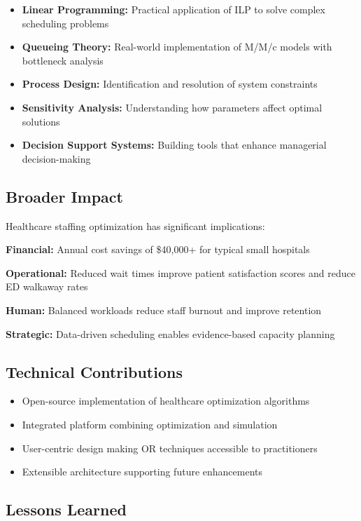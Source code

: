 \documentclass[12pt,a4paper]{article}
\begin{document}
\begin{itemize}
    \item \textbf{Linear Programming:} Practical application of ILP to solve complex scheduling problems
    \item \textbf{Queueing Theory:} Real-world implementation of M/M/c models with bottleneck analysis
    \item \textbf{Process Design:} Identification and resolution of system constraints
    \item \textbf{Sensitivity Analysis:} Understanding how parameters affect optimal solutions
    \item \textbf{Decision Support Systems:} Building tools that enhance managerial decision-making
\end{itemize}

\subsection{Broader Impact}

Healthcare staffing optimization has significant implications:

\textbf{Financial:} Annual cost savings of \$40,000+ for typical small hospitals

\textbf{Operational:} Reduced wait times improve patient satisfaction scores and reduce ED walkaway rates

\textbf{Human:} Balanced workloads reduce staff burnout and improve retention

\textbf{Strategic:} Data-driven scheduling enables evidence-based capacity planning

\subsection{Technical Contributions}

\begin{itemize}
    \item Open-source implementation of healthcare optimization algorithms
    \item Integrated platform combining optimization and simulation
    \item User-centric design making OR techniques accessible to practitioners
    \item Extensible architecture supporting future enhancements
\end{itemize}

\subsection{Lessons Learned}
\end{document}
